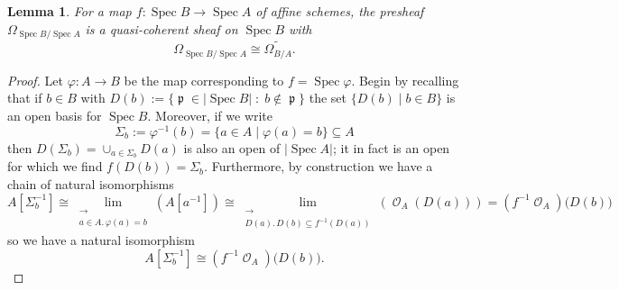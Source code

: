 \documentclass{amsart}
\newtheorem{lemma}[equation]{Lemma}
\theoremstyle{definition}
\DeclareMathOperator{\Ocal}{\mathcal{O}}
\DeclareMathOperator{\pfrak}{\mathfrak{p}}
\DeclareMathOperator{\Spec}{Spec}
\newcommand{\Kah}[2]{\Omega_{{#1}/{#2}}}
\numberwithin{equation}{subsection}
\begin{document}
\begin{lemma}\label{Lemma: Section Kahlers: Relative Kahlers are qcoh over Affine Schemes}
For a map $f:\Spec B \to \Spec A$ of affine schemes, the presheaf $\Kah{\Spec B}{\Spec A}$ is a quasi-coherent sheaf on $\Spec B$ with
\[
\Kah{\Spec B}{\Spec A} \cong \widetilde{\Kah{B}{A}}.
\]
\end{lemma}
\begin{proof}
Let $\varphi:A \to B$ be the map corresponding to $f = \Spec \varphi$. Begin by recalling that if $b \in B$ with $D(b) := \lbrace \pfrak \in \lvert \Spec B \rvert \; : \; b \notin \pfrak \rbrace$ the set $\lbrace D(b) \; | \; b \in B \rbrace$ is an open basis for $\Spec B$. Moreover, if we write
\[
\Sigma_b := \varphi^{-1}(b)  = \lbrace a \in A \; | \; \varphi(a) = b \rbrace \subseteq A
\]
then $D(\Sigma_b) = \cup_{a \in \Sigma_b} D(a)$ is also an open of $\lvert \Spec A \rvert$; it in fact is an open for which we find $f(D(b)) = \Sigma_b$. Furthermore, by construction we have a chain of natural isomorphisms
\[
A[\Sigma_{b}^{-1}] \cong \lim_{\substack{\longrightarrow \\ a \in A.\, \varphi(a) = b}}\left(A[a^{-1}]\right) \cong \lim_{\substack{\longrightarrow \\ D(a).\,D(b) \subseteq f^{-1}(D(a))}}\left( \Ocal_A(D(a))\right) = \left(f^{-1}\Ocal_A\right)\big(D(b)\big)
\]
so we have a natural isomorphism
\[
A[\Sigma_{b}^{-1}] \cong \left(f^{-1}\Ocal_A\right)\big(D(b)\big).
\]


\end{proof}
\end{document}
